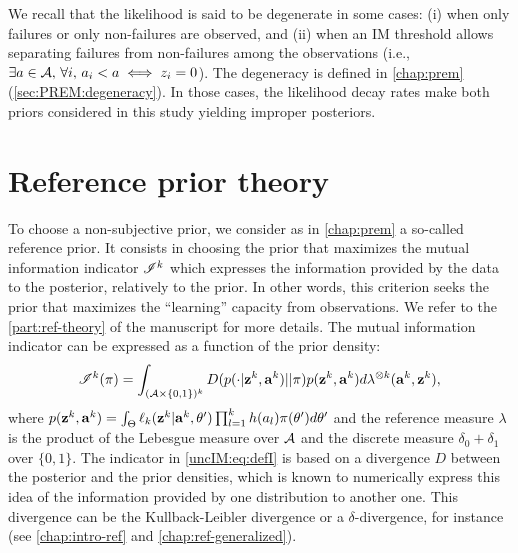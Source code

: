     We recall that the likelihood is said to be degenerate in some cases: (i) when only failures or only non-failures are observed, and (ii) when an IM threshold allows separating failures from non-failures among the observations (i.e., $\exists a\in\mathcal{A},\, \forall i,\, a_i<a\iff z_i=0$).
    The degeneracy is defined in \cref{chap:prem} (\cref{sec:PREM:degeneracy}). In those cases, the likelihood decay rates make both priors considered in this study yielding improper posteriors.
    


\section{Reference prior theory} \label{uncIM:sec:objprior}

    To choose a non-subjective prior, we consider as in \cref{chap:prem} a so-called reference prior. It consists in choosing the prior that maximizes the mutual information indicator $\mathscr{I}^k$ which expresses the information provided by the data to the posterior, relatively to the prior. In other words, this criterion seeks the prior that maximizes the ``learning'' capacity from observations. We refer to the \cref{part:ref-theory} of the manuscript for more details. The mutual information indicator can be expressed as a function of the prior density: %
    \begin{equation}
        \mathscr{I}^k(\pi) =
        \int_{(\mathcal{A}\times \{0,1\})^k} D(p(\cdot|\mathbf{z}^k,\mathbf{a}^k)||\pi)p(\mathbf{z}^k,\mathbf{a}^k)d\lambda^{\otimes k}(\mathbf{a}^k,\mathbf{z}^k),
         \label{uncIM:eq:defI}
    \end{equation}
    where $p(\mathbf{z}^k,\mathbf{a}^k) = \int_{\Theta} \ell_k(\mathbf{z}^k|\mathbf{a}^k,\theta' ) \prod_{l=1}^kh(a_l) \pi(\theta')d\theta'$ and the reference measure $\lambda$ is the product of the Lebesgue measure over $\mathcal{A}$ and the discrete measure $\delta_0+\delta_1$ over $\{0,1\}$. %
The indicator in \cref{uncIM:eq:defI} is based on a divergence $D$ between the posterior and the prior densities, which is known to numerically express this idea of the information provided by one distribution to another one.
    This divergence can be the Kullback-Leibler divergence or a $\delta$-divergence, for instance (see \cref{chap:intro-ref} and \cref{chap:ref-generalized}).

